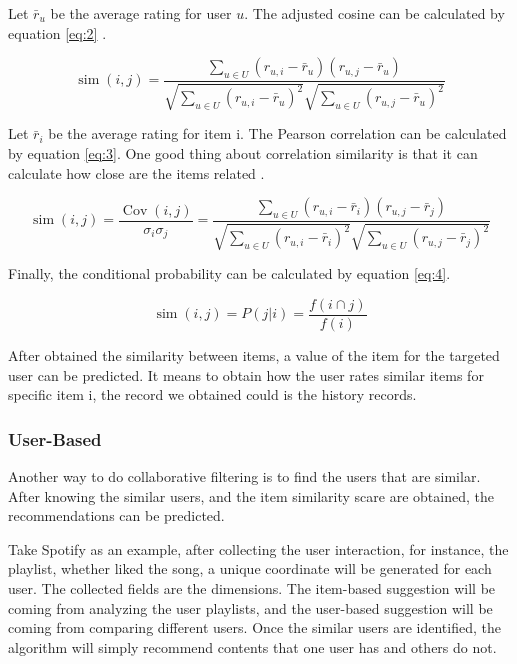 Let $\bar{r}_{u}$ be the average rating for user $u$. The adjusted cosine can be calculated by equation \eqref{eq:2} \cite{adjustedcosinesimilarity}.

\begin{equation}
  \operatorname{sim}(i, j)=\frac{\sum_{u \in U}\left(r_{u, i}-\bar{r}_{u}\right)\left(r_{u, j}-\bar{r}_{u}\right)}{\sqrt{\sum_{u \in U}\left(r_{u, i}-\bar{r}_{u}\right)^{2}} \sqrt{\sum_{u \in U}\left(r_{u, j}-\bar{r}_{u}\right)^{2}}}
  \label{eq:2}
\end{equation}

Let $\bar{r}_{i}$ be the average rating for item i. The Pearson correlation can be calculated by equation \eqref{eq:3}. One good thing about correlation similarity is that it can calculate how close are the items related \cite{Celma2010}.

\begin{equation}
  \operatorname{sim}(i, j)=\frac{\operatorname{Cov}(i, j)}{\sigma_{i} \sigma_{j}}=\frac{\sum_{u \in U}\left(r_{u, i}-\bar{r}_{i}\right)\left(r_{u, j}-\bar{r}_{j}\right)}{\sqrt{\sum_{u \in U}\left(r_{u, i}-\bar{r}_{i}\right)^{2}} \sqrt{\sum_{u \in U}\left(r_{u, j}-\bar{r}_{j}\right)^{2}}}
  \label{eq:3}
\end{equation}

Finally, the conditional probability can be calculated by equation \eqref{eq:4}.

\begin{equation}
  \operatorname{sim}(i, j)=P(j | i) = \frac{f(i \cap j)}{f(i)}
  \label{eq:4}
\end{equation}

After obtained the similarity between items, a value of the item for the targeted user can be predicted. It means to obtain how the user rates similar items for specific item i, the record we obtained could is the history records.

\subsubsection{User-Based}

Another way to do collaborative filtering is to find the users that are similar. After knowing the similar users, and the item similarity scare are obtained, the recommendations can be predicted.

Take Spotify as an example, after collecting the user interaction, for instance, the playlist, whether liked the song, a unique coordinate will be generated for each user. The collected fields are the dimensions. The item-based suggestion will be coming from analyzing the user playlists, and the user-based suggestion will be coming from comparing different users. Once the similar users are identified, the algorithm will simply recommend contents that one user has and others do not.

